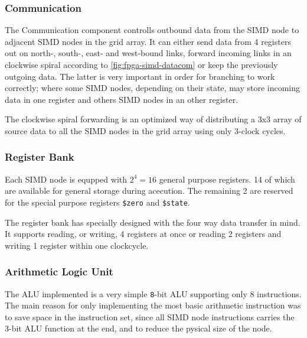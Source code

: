 \subsubsection{Communication}
The Communication component controlls outbound data from the \ac{SIMD} node to
adjacent \ac{SIMD} nodes in the grid array. It can either send data from 4
registers out on north-, south-, east- and west-bound links, forward incoming
links in an clockwise spiral according to \ref{fig:fpga-simd-datacom} or keep
the previously outgoing data. The latter is very important in order for
branching to work correctly; where some \ac{SIMD} nodes, depending on their
state, may store incoming data in one register and others \ac{SIMD} nodes in an
other register.

The clockwise spiral forwarding is an optimized way of distributing a 3x3 array
of source data to all the \ac{SIMD} nodes in the grid array using only 3-clock
cycles. 

\subsubsection{Register Bank}
Each \ac{SIMD} node is equpped with $2^4 = 16$ general purpose registers. 14 of
which are available for general storage during acecution. The remaining 2 are
reserved for the special purpose registers {\tt \$zero} and {\tt \$state}.



The register bank has specially designed with the four way data transfer in
mind. It supports reading, or writing, 4 registers at once or reading 2
registers and writing 1 register within one clockcycle.

\subsubsection{Arithmetic Logic Unit}


The \ac{ALU} implemented is a very simple {\tt 8}-bit \ac{ALU} supporting only 8
instructions. The main reason for only implementing the most basic arithmetic
instruction was to save space in the instruction set, since all \ac{SIMD} node
instructions carries the 3-bit \ac{ALU} function at the end, and to reduce the
pysical size of the node.


